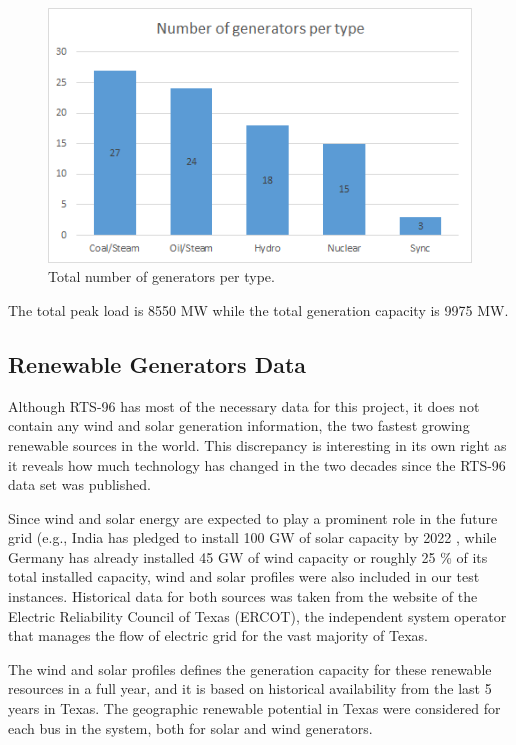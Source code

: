 \documentclass[12pt,LUDisStyle,twosided]{book}
\begin{document}
\begin{figure}[h!] 
  \includegraphics[width=\textwidth,keepaspectratio]{numberGeneratorsPerType.png}
  \caption{Total number of generators per type.}
  \label{fig:generatorDistribution}
\end{figure}



The total peak load is 8550 MW while the total generation capacity is 9975 MW. 

\subsection{Renewable Generators Data}

Although RTS-96 has most of the necessary data for this project, it does not contain any wind and solar generation information, the two fastest growing renewable sources in the world. This discrepancy is interesting in its own right as it reveals how much technology has changed in the two decades since the RTS-96 data set was published.

Since wind and solar energy are expected to play a prominent role in the future grid (e.g., India has pledged to install 100 GW of solar capacity by 2022 \cite{mitindia}, while Germany has already installed 45 GW of wind capacity or roughly 25 \% of its total installed capacity\cite{fraunpower}, wind and solar profiles were also included in our test instances. Historical data for both sources was taken from the website of the Electric Reliability Council of Texas (ERCOT), the independent system operator that manages the flow of electric grid for the vast majority of Texas.  

The wind and solar profiles defines the generation capacity for these renewable resources in a full year, and it is based on historical availability from the last 5 years in Texas. The geographic renewable potential in Texas were considered for each bus in the system, both for solar and wind generators.
\end{document}

